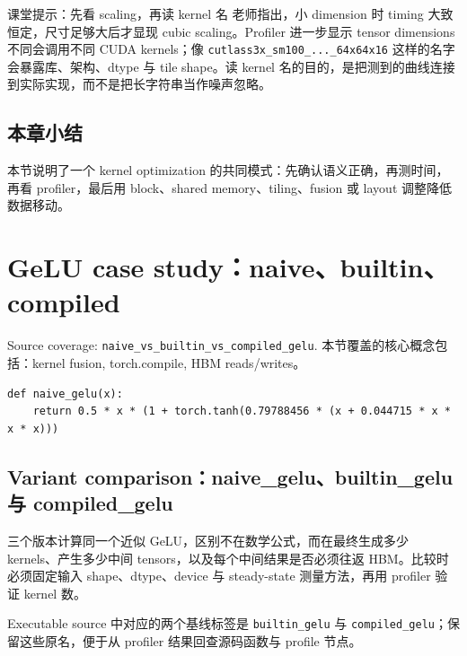 \documentclass[a4paper]{article}
\begin{document}
\begin{knowledgebox}{课堂提示：先看 scaling，再读 kernel 名}
老师指出，小 dimension 时 timing 大致恒定，尺寸足够大后才显现 cubic scaling。Profiler 进一步显示 tensor dimensions 不同会调用不同 CUDA kernels；像 \texttt{cutlass3x\_sm100\_...\_64x64x16} 这样的名字会暴露库、架构、dtype 与 tile shape。读 kernel 名的目的，是把测到的曲线连接到实际实现，而不是把长字符串当作噪声忽略。
\end{knowledgebox}
\subsection{本章小结}
本节说明了一个 kernel optimization 的共同模式：先确认语义正确，再测时间，再看 profiler，最后用 block、shared memory、tiling、fusion 或 layout 调整降低数据移动。

\section{GeLU case study：naive、builtin、compiled}

Source coverage: \texttt{naive\_vs\_builtin\_vs\_compiled\_gelu}. 本节覆盖的核心概念包括：kernel fusion, torch.compile, HBM reads/writes。


\begin{lstlisting}[caption={naive GeLU 的问题：多个小操作导致多次 HBM 往返}]
def naive_gelu(x):
    return 0.5 * x * (1 + torch.tanh(0.79788456 * (x + 0.044715 * x * x * x)))
\end{lstlisting}

\subsection{Variant comparison：naive\_gelu、builtin\_gelu 与 compiled\_gelu}

三个版本计算同一个近似 GeLU，区别不在数学公式，而在最终生成多少 kernels、产生多少中间 tensors，以及每个中间结果是否必须往返 HBM。比较时必须固定输入 shape、dtype、device 与 steady-state 测量方法，再用 profiler 验证 kernel 数。

Executable source 中对应的两个基线标签是 \verb|builtin_gelu| 与 \verb|compiled_gelu|；保留这些原名，便于从 profiler 结果回查源码函数与 profile 节点。
\end{document}
